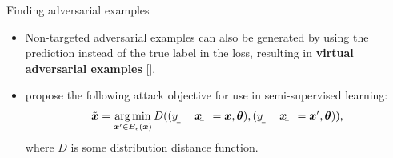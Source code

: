 \documentclass{beamer}
\newcommand{\citet}[1]{{\color{citecolor}\relscale{0.8}\textcite{#1}}}
\newcommand{\citep}[1]{{\color{citecolor}\relscale{0.8}[\textcite{#1}]}}
\begin{document}
\begin{frame}[allowframebreaks=0.9]{Finding adversarial examples}
\begin{itemize}
	\item Non-targeted adversarial examples can also be generated by using the prediction instead of the true label in the loss, resulting in \textbf{virtual adversarial examples} \citep{Miyato:2017:VATRMSSSL,Kurakin:2016:AMLS}.	
	\item \citet{Miyato:2017:VATRMSSSL} propose the following attack objective for use in semi-supervised learning:
	\begin{align}
	\tilde{\vec x} = \argmin_{\vec x'\in B_\epsilon(\vec x)} D((\rvar y\mid \rvec x = \vec x, \vec\theta), (\rvar y\mid \rvec x = \vec x', \vec\theta)) \text{,}
	\end{align}
	where $D$ is some distribution distance function.
\end{itemize}
\end{frame}
\end{document}
